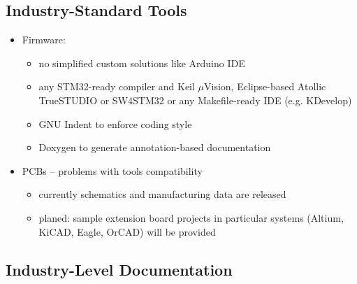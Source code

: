 
\subsection{Industry-Standard Tools}

\begin{frame}%

         \begin{itemize}
           \item Firmware: 
            \begin{itemize}
               \item no simplified custom solutions like Arduino IDE
               \item any STM32-ready compiler and Keil $\mu$Vision, Eclipse-based Atollic TrueSTUDIO or SW4STM32 or any Makefile-ready IDE (e.g. KDevelop)
               \item GNU Indent to enforce coding style
               \item Doxygen to generate annotation-based documentation
            \end{itemize}
           \item PCBs -- problems with tools compatibility
           \begin{itemize}
               \item currently schematics and manufacturing data are released
               \item planed: sample extension board projects in particular systems (Altium, KiCAD, Eagle, OrCAD) will be provided
            \end{itemize}
         \end{itemize}
  
\end{frame}

\subsection{Industry-Level Documentation}

